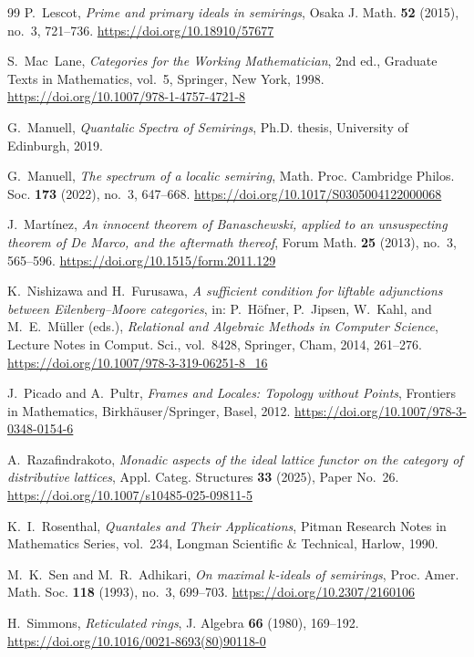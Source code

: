 \documentclass[12pt,leqno]{amsart}
\theoremstyle{definition}
\numberwithin{equation}{section}
\theoremstyle{remark}
\begin{document}
\begin{thebibliography}{99}
P.~Lescot,
\emph{Prime and primary ideals in semirings},
Osaka J. Math. \textbf{52} (2015), no.~3, 721--736.
\url{https://doi.org/10.18910/57677}

S.~Mac~Lane,
\emph{Categories for the Working Mathematician},
2nd ed., Graduate Texts in Mathematics, vol.~5,
Springer, New York, 1998.
\url{https://doi.org/10.1007/978-1-4757-4721-8}

G.~Manuell,
\emph{Quantalic Spectra of Semirings},
Ph.D. thesis, University of Edinburgh, 2019.

G.~Manuell,
\emph{The spectrum of a localic semiring},
Math. Proc. Cambridge Philos. Soc. \textbf{173} (2022), no.~3, 647--668.
\url{https://doi.org/10.1017/S0305004122000068}

J.~Mart\'inez,
\emph{An innocent theorem of Banaschewski, applied to an unsuspecting theorem of De Marco, and the aftermath thereof},
Forum Math. \textbf{25} (2013), no.~3, 565--596.
\url{https://doi.org/10.1515/form.2011.129}

K.~Nishizawa and H.~Furusawa,
\emph{A sufficient condition for liftable adjunctions between Eilenberg--Moore categories},
in: P.~H\"ofner, P.~Jipsen, W.~Kahl, and M.~E.~M\"uller (eds.),
\emph{Relational and Algebraic Methods in Computer Science},
Lecture Notes in Comput. Sci., vol.~8428, Springer, Cham, 2014, 261--276.
\url{https://doi.org/10.1007/978-3-319-06251-8_16}

J.~Picado and A.~Pultr,
\emph{Frames and Locales: Topology without Points},
Frontiers in Mathematics, Birkh\"auser/Springer, Basel, 2012.
\url{https://doi.org/10.1007/978-3-0348-0154-6}

A.~Razafindrakoto,
\emph{Monadic aspects of the ideal lattice functor on the category of distributive lattices},
Appl. Categ. Structures \textbf{33} (2025), Paper No.~26.
\url{https://doi.org/10.1007/s10485-025-09811-5}

K.~I.~Rosenthal,
\emph{Quantales and Their Applications},
Pitman Research Notes in Mathematics Series, vol.~234,
Longman Scientific \& Technical, Harlow, 1990.

M.~K.~Sen and M.~R.~Adhikari,
\emph{On maximal $k$-ideals of semirings},
Proc. Amer. Math. Soc. \textbf{118} (1993), no.~3, 699--703.
\url{https://doi.org/10.2307/2160106}

H.~Simmons,
\emph{Reticulated rings},
J. Algebra \textbf{66} (1980), 169--192.
\url{https://doi.org/10.1016/0021-8693(80)90118-0}


\end{thebibliography}
\end{document}
